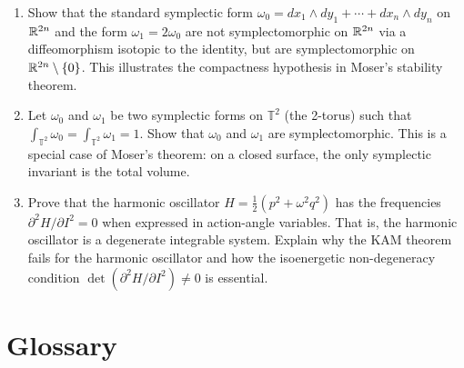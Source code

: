 \begin{enumerate}
\item [I] Show that the standard symplectic form $\omega_0 = dx_1 \wedge dy_1 + \cdots + dx_n \wedge dy_n$ on $\mathbb{R}^{2n}$ and the form $\omega_1 = 2\omega_0$ are not symplectomorphic on $\mathbb{R}^{2n}$ via a diffeomorphism isotopic to the identity, but are symplectomorphic on $\mathbb{R}^{2n} \setminus \{0\}$. This illustrates the compactness hypothesis in Moser's stability theorem.

\item [I] Let $\omega_0$ and $\omega_1$ be two symplectic forms on $\mathbb{T}^2$ (the 2-torus) such that $\int_{\mathbb{T}^2} \omega_0 = \int_{\mathbb{T}^2} \omega_1 = 1$. Show that $\omega_0$ and $\omega_1$ are symplectomorphic. This is a special case of Moser's theorem: on a closed surface, the only symplectic invariant is the total volume.

\item [I] Prove that the harmonic oscillator $H = \frac{1}{2}(p^2 + \omega^2 q^2)$ has the frequencies $\partial^2 H / \partial I^2 = 0$ when expressed in action-angle variables. That is, the harmonic oscillator is a degenerate integrable system. Explain why the KAM theorem fails for the harmonic oscillator and how the isoenergetic non-degeneracy condition $\det(\partial^2 H / \partial I^2) \neq 0$ is essential.

\end{enumerate}

\section*{Glossary}


